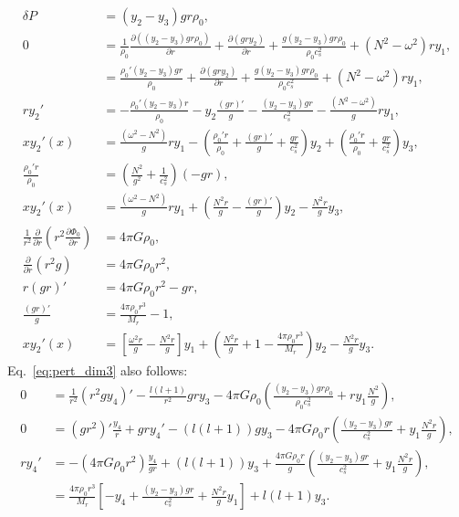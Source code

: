\documentclass[11pt,
        usenames, %
        twocolumn,
        landscape,
        dvipsnames %
    ]{article}
\newcommand*{\pd}[2]{\frac{\partial#1}{\partial#2}}
\newcommand*{\p}[1]{\left(#1\right)}
\newcommand*{\s}[1]{\left[#1\right]}
\begin{document}
\begin{align}
    \delta P &= (y_2 - y_3)gr\rho_0,\\
    0 &= \frac{1}{\rho_0}\pd{((y_2 - y_3)gr\rho_0)}{r}
            + \pd{\p{gry_2}}{r}
            + \frac{g(y_2 - y_3)gr\rho_0}{\rho_0c_s^2}
            + \p{N^2 - \omega^2}ry_1,\nonumber\\
        &= \frac{\rho_0'(y_2 - y_3)gr}{\rho_0}
            + \pd{\p{gry_2}}{r}
            + \frac{g(y_2 - y_3)gr\rho_0}{\rho_0c_s^2}
            + \p{N^2 - \omega^2}ry_1,\nonumber\\
    ry_2' &= -\frac{\rho_0'(y_2 - y_3)r}{\rho_0}
            - y_2\frac{(gr)'}{g}
            - \frac{(y_2 - y_3)gr}{c_s^2}
            - \frac{\p{N^2 - \omega^2}}{g}ry_1,\nonumber\\
    xy_2'(x) &= \frac{\p{\omega^2 - N^2}}{g}ry_1
            - \p{\frac{\rho_0' r}{\rho_0} + \frac{(gr)'}{g} + \frac{gr}{c_s^2}}y_2
            + \p{\frac{\rho_0' r}{\rho_0} + \frac{gr}{c_s^2}}y_3,\nonumber\\
    \frac{\rho_0' r}{\rho_0} &= \p{\frac{N^2}{g^2} + \frac{1}{c_s^2}}\p{-gr},\\
    xy_2'(x) &= \frac{\p{\omega^2 - N^2}}{g}ry_1
            + \p{\frac{N^2r}{g} - \frac{(gr)'}{g}}y_2
            - \frac{N^2r}{g}y_3,\nonumber\\
    \frac{1}{r^2}\pd{}{r}\p{r^2\pd{\Phi_0}{r}} &= 4\pi G \rho_0,\nonumber\\
    \pd{}{r}\p{r^2g} &= 4\pi G\rho_0r^2,\nonumber\\
    r(gr)' &= 4\pi G\rho_0r^2 - gr,\nonumber\\
    \frac{(gr)'}{g} &= \frac{4\pi \rho_0 r^3}{M_r} - 1,\\
    xy_2'(x) &= \s{\frac{\omega^2r}{g} - \frac{N^2r}{g}}y_1
            + \p{\frac{N^2r}{g} + 1 - \frac{4\pi \rho_0 r^3}{M_r}}y_2
            - \frac{N^2r}{g}y_3.
\end{align}
Eq.~\eqref{eq:pert_dim3} also follows:
\begin{align}
    0 &= \frac{1}{r^2}\p{r^2gy_4}'
            - \frac{l(l+1)}{r^2}gry_3
            - 4\pi G \rho_0\p{
                \frac{(y_2 - y_3)gr\rho_0}{\rho_0c_s^2}
                + ry_1\frac{N^2}{g}
            },\nonumber\\
    0 &= (gr^2)'\frac{y_4}{r} + gry_4'
            - \p{l(l+1)}gy_3
            - 4\pi G \rho_0r\p{
                \frac{(y_2 - y_3)gr}{c_s^2}
                + y_1\frac{N^2r}{g}
            },\nonumber\\
    ry_4' &= -(4\pi G\rho_0r^2)\frac{y_4}{gr}
            + \p{l(l+1)}y_3
            + \frac{4\pi G\rho_0 r}{g}
                \p{
                    \frac{(y_2 - y_3)gr}{c_s^2}
                    + y_1\frac{N^2r}{g}
                },\nonumber\\
        &= \frac{4\pi \rho_0r^3}{M_r}\s{-y_4
                + \frac{(y_2 - y_3) gr}{c_s^2}
                + \frac{N^2r}{g}y_1}
            + l(l+1)y_3.
\end{align}
\end{document}
